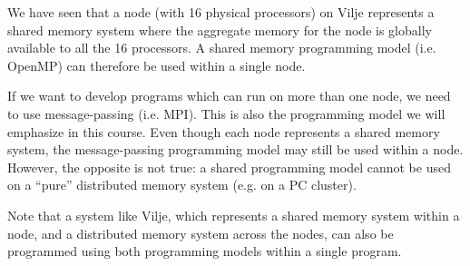 We have seen that a node (with 16 physical processors) on Vilje represents a
shared memory system where the aggregate memory for the node is globally
available to all the 16 processors. A shared memory programming model (i.e.
OpenMP) can therefore be used within a single node.

If we want to develop programs which can run on more than one node, we need to
use message-passing (i.e. MPI). This is also the programming model we will
emphasize in this course. Even though each node represents a shared memory
system, the message-passing programming model may still be used within a node.
However, the opposite is not true: a shared programming model cannot be used on
a ``pure'' distributed memory system (e.g. on a PC cluster).

Note that a system like Vilje, which represents a shared memory system within a
node, and a distributed memory system across the nodes, can also be programmed
using both programming models within a single program.

